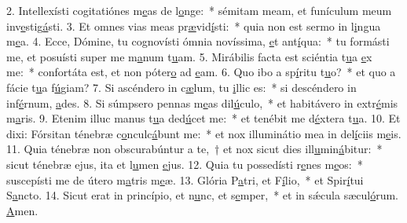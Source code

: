 2. Intellexísti cogitatiónes m\uline{e}as de l\uline{o}nge:~* sémitam meam, et funículum meum inv\uline{e}stig\uline{á}sti.
3. Et omnes vias meas pr\uline{æ}vid\uline{í}sti:~* quia non est sermo in l\uline{i}ngua m\uline{e}a.
4. Ecce, Dómine, tu cognovísti ómnia novíssima, \uline{e}t ant\uline{í}qua:~* tu formásti me, et posuísti super me m\uline{a}num t\uline{u}am.
5. Mirábilis facta est sciéntia t\uline{u}a \uline{e}x me:~* confortáta est, et non póter\uline{o} ad \uline{e}am.
6. Quo ibo a sp\uline{í}ritu t\uline{u}o?~* et quo a fácie t\uline{u}a f\uline{ú}giam?
7. Si ascéndero in c\uline{æ}lum, tu \uline{i}llic es:~* si descéndero in inf\uline{é}rnum, \uline{a}des.
8. Si súmpsero pennas m\uline{e}as dil\uline{ú}culo,~* et habitávero in extr\uline{é}mis m\uline{a}ris.
9. Etenim illuc manus t\uline{u}a ded\uline{ú}cet me:~* et tenébit me d\uline{é}xtera t\uline{u}a.
10. Et dixi: Fórsitan ténebræ c\uline{o}nculc\uline{á}bunt me:~* et nox illuminátio mea in del\uline{í}ciis m\uline{e}is.
11. Quia ténebræ non obscurabúntur a te,~† et nox sicut dies ill\uline{u}min\uline{á}bitur:~* sicut ténebræ ejus, ita et l\uline{u}men \uline{e}jus.
12. Quia tu possedísti r\uline{e}nes m\uline{e}os:~* suscepísti me de útero m\uline{a}tris m\uline{e}æ.
13. Glória P\uline{a}tri, et F\uline{í}lio,~* et Spir\uline{í}tui S\uline{a}ncto.
14. Sicut erat in princípio, et n\uline{u}nc, et s\uline{e}mper,~* et in sǽcula sæcul\uline{ó}rum. \uline{A}men.

